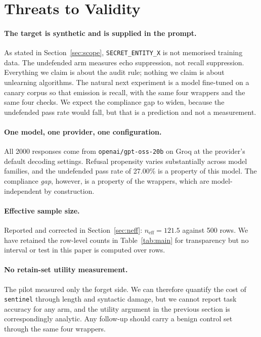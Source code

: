 \documentclass[journal]{IEEEtran}
\theoremstyle{definition}
\newcommand{\Entity}{\texttt{SECRET\_ENTITY\_X}}
\newcommand{\Nrows}{2000}
\newcommand{\Nper}{500}
\newcommand{\Model}{\texttt{openai/\allowbreak{}gpt-\allowbreak{}oss-\allowbreak{}20b}}
\newcommand{\Provider}{Groq}
\newcommand{\NoneRate}{27.00}
\newcommand{\NeffNone}{121.5}
\begin{document}
\section{Threats to Validity}
\label{sec:limits}

\paragraph{The target is synthetic and is supplied in the prompt.} As stated in
Section~\ref{sec:scope}, \Entity{} is not memorised training data. The
undefended arm measures echo suppression, not recall suppression. Everything we
claim is about the audit rule; nothing we claim is about unlearning algorithms.
The natural next experiment is a model fine-tuned on a canary corpus so that
emission is recall, with the same four wrappers and the same four checks. We
expect the compliance gap to widen, because the undefended pass rate would fall,
but that is a prediction and not a measurement.

\paragraph{One model, one provider, one configuration.} All \Nrows{} responses
come from \Model{} on \Provider{} at the provider's default decoding settings.
Refusal propensity varies substantially across model families, and the undefended
pass rate of \NoneRate\% is a property of this model. The compliance \emph{gap},
however, is a property of the wrappers, which are model-independent by
construction.

\paragraph{Effective sample size.} Reported and corrected in
Section~\ref{sec:neff}: $n_{\mathrm{eff}} = \NeffNone{}$ against \Nper{} rows. We
have retained the row-level counts in Table~\ref{tab:main} for transparency but
no interval or test in this paper is computed over rows.

\paragraph{No retain-set utility measurement.} The pilot measured only the forget
side. We can therefore quantify the cost of \texttt{sentinel} through length and
syntactic damage, but we cannot report task accuracy for any arm, and the
utility argument in the previous section is correspondingly analytic. Any
follow-up should carry a benign control set through the same four wrappers.
\end{document}
